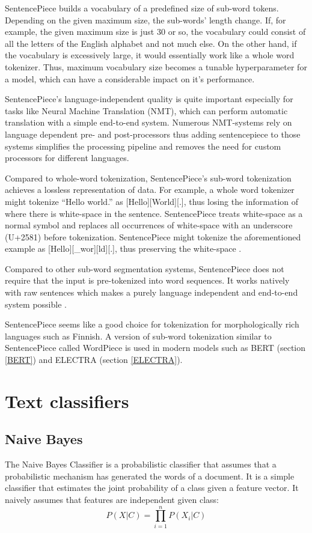 SentencePiece builds a vocabulary of a predefined size of sub-word tokens.
Depending on the given maximum size, the sub-words' length change.
If, for example, the given maximum size is just 30 or so, the vocabulary could consist of all the letters of the English alphabet and not much else.
On the other hand, if the vocabulary is excessively large, it would essentially work like a whole word tokenizer.
Thus, maximum vocabulary size becomes a tunable hyperparameter for a model, which can have a considerable impact on it's performance.

SentencePiece's language-independent quality is quite important especially for tasks like Neural Machine Translation (NMT), which can perform automatic translation with a simple end-to-end system.
Numerous NMT-systems rely on language dependent pre- and post-processors thus adding sentencepiece to those systems simplifies the processing pipeline and removes the need for custom processors for different languages.

Compared to whole-word tokenization, SentencePiece's sub-word tokenization achieves a lossless representation of data.
For example, a whole word tokenizer might tokenize ``Hello world.'' as [Hello][World][.], thus losing the information of where there is white-space in the sentence.
SentencePiece treats white-space as a normal symbol and replaces all occurrences of white-space with an underscore (U+2581) before tokenization.
SentencePiece might tokenize the aforementioned example as [Hello][\_wor][ld][.], thus preserving the white-space \cite{kudo2018}.

Compared to other sub-word segmentation systems, SentencePiece does not require that the input is pre-tokenized into word sequences.
It works natively with raw sentences which makes a purely language independent and end-to-end system possible \cite{kudo2018}.

SentencePiece seems like a good choice for tokenization for morphologically rich languages such as Finnish.
A version of sub-word tokenization similar to SentencePiece called WordPiece is used in modern models such as BERT (section \ref{BERT}) and ELECTRA (section \ref{ELECTRA}).


\section{Text classifiers} \label{Text classifiers}
\subsection{Naive Bayes} \label{Naive Bayes}
The Naive Bayes Classifier is a probabilistic classifier that assumes that a probabilistic mechanism has generated the words of a document.
It is a simple classifier that estimates the joint probability of a class given a feature vector.
It naively assumes that features are independent given class:
\begin{equation}
  P(X|C) = \prod_{i=1}^{n} P(X_{i}|C)
\end{equation}


